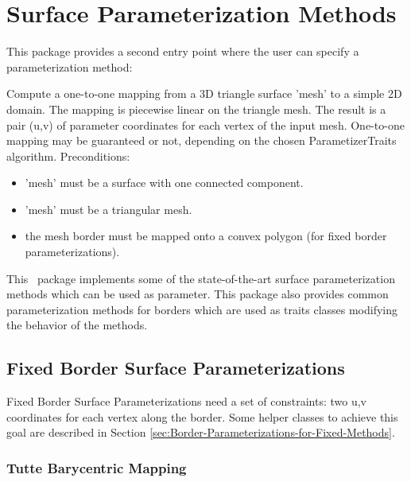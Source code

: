 \section{Surface Parameterization Methods}


This package provides a second  entry point
where the user can specify a parameterization method:

{
Compute a one-to-one mapping from a 3D triangle surface 'mesh' to a simple 2D domain. The mapping is piecewise linear on the triangle mesh. The result is a pair (u,v) of parameter coordinates for each vertex of the input mesh.
One-to-one mapping may be guaranteed or not, depending on the chosen ParametizerTraits algorithm.
Preconditions:\begin{itemize}
\item 'mesh' must be a surface with one connected component.\item 'mesh' must be a triangular mesh.\item the mesh border must be mapped onto a convex polygon (for fixed border parameterizations).\end{itemize}
}


This \cgal\ package implements some of the state-of-the-art surface
parameterization methods which can be used as
 parameter. This package also provides common parameterization methods for
borders which are used as traits classes modifying the behavior of
the  methods.


\subsection{Fixed Border Surface Parameterizations}


Fixed Border Surface Parameterizations need a set of constraints: two
u,v coordinates for each vertex along the border. Some helper
classes to achieve this goal are described in Section
\ref{sec:Border-Parameterizations-for-Fixed-Methods}.

\subsubsection{Tutte Barycentric Mapping}

